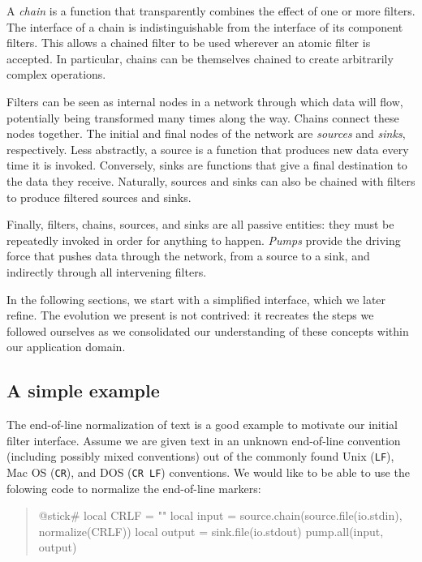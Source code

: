\documentclass[10pt]{article}
\newcommand{\CR}{\texttt{CR}}
\newcommand{\LF}{\texttt{LF}}
\newcommand{\CRLF}{\texttt{CR~LF}}
\begin{document}
A \emph{chain} is a function that transparently combines the
effect of one or more filters. The interface of a chain is
indistinguishable from the interface of its component
filters.  This  allows a chained filter to be used wherever
an atomic filter is accepted. In particular, chains can be
themselves chained to create arbitrarily complex operations.

Filters can be seen as internal nodes in a network through
which data will flow, potentially being transformed many
times along the way.  Chains connect these nodes together.
The initial and final nodes of the network are
\emph{sources} and \emph{sinks}, respectively.  Less
abstractly, a source is a function that produces new data
every time it is invoked.  Conversely, sinks are functions
that give a final destination to the data they receive.
Naturally, sources and sinks can also be chained with
filters to produce filtered sources and sinks.

Finally, filters, chains, sources, and sinks are all passive
entities: they must be repeatedly invoked in order for
anything to happen.  \emph{Pumps} provide the driving force
that pushes data through the network, from a source to a
sink, and indirectly through all intervening filters.

In the following sections, we start with a simplified
interface, which we later refine. The evolution we present
is not contrived: it recreates the steps we followed
ourselves as we consolidated our understanding of these
concepts within our application domain. 

\subsection{A simple example}

The end-of-line normalization of text is a good
example to motivate our initial filter interface. 
Assume we are given text in an unknown end-of-line
convention (including possibly mixed conventions) out of the
commonly found Unix (\LF), Mac OS (\CR), and
DOS (\CRLF) conventions. We would like to be able to 
use the folowing code to normalize the end-of-line markers: 
\begin{quote}
\begin{lua}
@stick#
local CRLF = ""
local input = source.chain(source.file(io.stdin), normalize(CRLF))
local output = sink.file(io.stdout)
pump.all(input, output)
%
\end{lua}
\end{quote}
\end{document}
